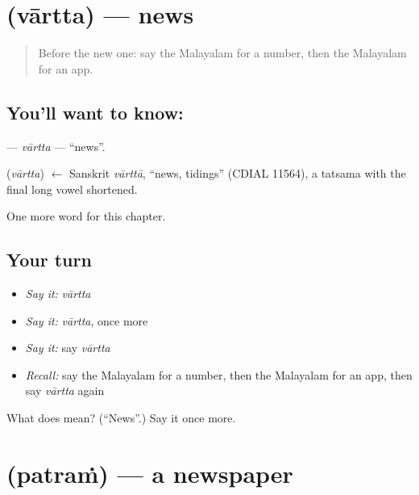\section[\texorpdfstring{\ml{വാർത്ത} (vārtta)}{വാർത്ത (vārtta)}]{ (vārtta) — news}

\label{lesson:ML-C250-vartta}



\begin{quote}
Before the new one: say the Malayalam for a number, then the Malayalam for an app.
\end{quote}

\subsection*{You'll want to know: }
\textbf{} — \emph{vārtta} — \textquotedblleft{}news\textquotedblright{}.

\begin{cousinweb}
\textbf{} (\emph{vārtta}) $\leftarrow$ Sanskrit \emph{vārttā}, \textquotedblleft{}news, tidings\textquotedblright{} (CDIAL 11564), a tatsama with the final long vowel shortened.
\end{cousinweb}

\begin{grammarlens}[title={What you've built}]
One more word for this chapter.
\end{grammarlens}

\subsection*{Your turn}
\begin{itemize}
\raggedright
  \item \emph{Say it:} \emph{vārtta}
  \item \emph{Say it:} \emph{vārtta}, once more
  \item \emph{Say it:} say \emph{vārtta}
  \item \emph{Recall:} say the Malayalam for a number, then the Malayalam for an app, then say \emph{vārtta} again
\end{itemize}

\begin{tcolorbox}[breakable,colback=teal!4,colframe=teal!35!black,title={Before you move on}]
What does  mean? (\textquotedblleft{}News\textquotedblright{}.) Say it once more.
\end{tcolorbox}
\section[\texorpdfstring{\ml{പത്രം} (patraṁ)}{പത്രം (patraṁ)}]{ (patraṁ) — a newspaper}

